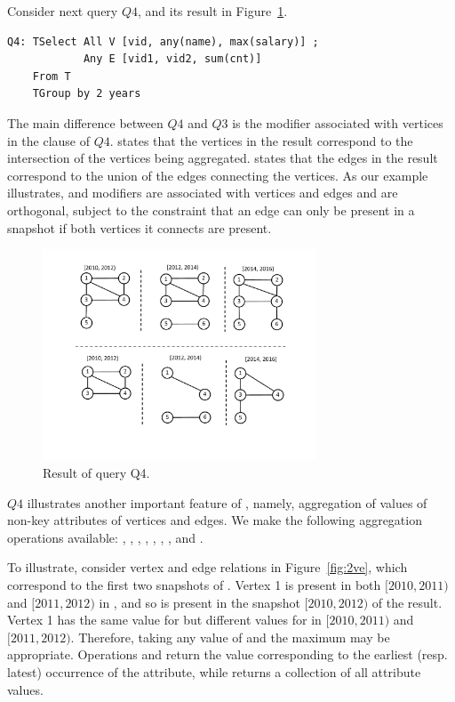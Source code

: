 Consider next query $Q4$, and its result in
Figure~\ref{fig:tg_all_any}.

\begin{verbatim}
Q4: TSelect All V [vid, any(name), max(salary)] ; 
            Any E [vid1, vid2, sum(cnt)] 
    From T 
    TGroup by 2 years
\end{verbatim}

The main difference between $Q4$ and $Q3$ is the  modifier
associated with vertices in the  clause of $Q4$.
 states that the vertices in the result correspond to the
intersection of the vertices being aggregated.   states
that the edges in the result correspond to the union of the edges
connecting the vertices.  As our example illustrates,  and
 modifiers are associated with vertices and edges and are
orthogonal, subject to the constraint that an edge can only be present
in a snapshot if both vertices it connects are present.

\begin{figure}
\includegraphics[width=3.2in]{figs/TGroupAllAny.pdf}
\caption{Result of query Q4.}
\label{fig:tg_all_any}
\end{figure}

$Q4$ illustrates another important feature of \ql, namely, aggregation
of values of non-key attributes of vertices and edges.  We make the
following aggregation operations available: ,
, , , , ,
, and .

To illustrate, consider vertex and edge relations in
Figure~\ref{fig:2ve}, which correspond to the first two snapshots of
.  Vertex 1 is present in both $[2010, 2011)$ and $[2011,
    2012)$ in , and so is present in the snapshot $[2010,
      2012)$ of the result.  Vertex 1 has the same value for
       but different values for  in $[2010,
        2011)$ and $[2011, 2012)$.  Therefore, taking any value of
           and the maximum  may be
          appropriate.  Operations  and 
          return the value corresponding to the earliest
          (resp. latest) occurrence of the attribute, while
           returns a collection of all attribute values.

